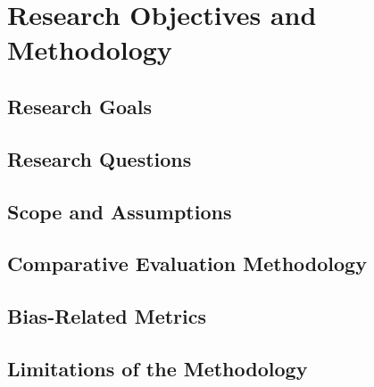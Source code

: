 \chapter{Research Objectives and Methodology}
\label{cha:research-objectives-and-methodology}

\section{Research Goals}

\section{Research Questions}

\section{Scope and Assumptions}

\section{Comparative Evaluation Methodology}

\section{Bias-Related Metrics}

\section{Limitations of the Methodology}
